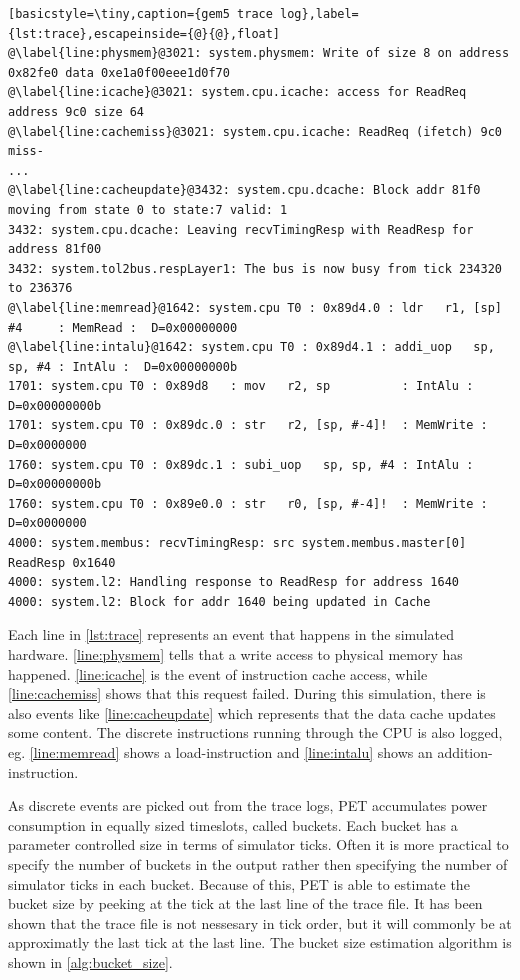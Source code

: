 \begin{lstlisting}[basicstyle=\tiny,caption={gem5 trace log},label={lst:trace},escapeinside={@}{@},float]
@\label{line:physmem}@3021: system.physmem: Write of size 8 on address 0x82fe0 data 0xe1a0f00eee1d0f70
@\label{line:icache}@3021: system.cpu.icache: access for ReadReq address 9c0 size 64
@\label{line:cachemiss}@3021: system.cpu.icache: ReadReq (ifetch) 9c0 miss-
...
@\label{line:cacheupdate}@3432: system.cpu.dcache: Block addr 81f0 moving from state 0 to state:7 valid: 1
3432: system.cpu.dcache: Leaving recvTimingResp with ReadResp for address 81f00
3432: system.tol2bus.respLayer1: The bus is now busy from tick 234320 to 236376
@\label{line:memread}@1642: system.cpu T0 : 0x89d4.0 : ldr   r1, [sp] #4     : MemRead :  D=0x00000000
@\label{line:intalu}@1642: system.cpu T0 : 0x89d4.1 : addi_uop   sp, sp, #4 : IntAlu :  D=0x00000000b
1701: system.cpu T0 : 0x89d8   : mov   r2, sp          : IntAlu :  D=0x00000000b
1701: system.cpu T0 : 0x89dc.0 : str   r2, [sp, #-4]!  : MemWrite :  D=0x0000000
1760: system.cpu T0 : 0x89dc.1 : subi_uop   sp, sp, #4 : IntAlu :  D=0x00000000b
1760: system.cpu T0 : 0x89e0.0 : str   r0, [sp, #-4]!  : MemWrite :  D=0x0000000
4000: system.membus: recvTimingResp: src system.membus.master[0] ReadResp 0x1640
4000: system.l2: Handling response to ReadResp for address 1640
4000: system.l2: Block for addr 1640 being updated in Cache
\end{lstlisting}

Each line in \autoref{lst:trace} represents an event that happens in the
simulated hardware.  \autoref{line:physmem} tells that a write access to
physical memory has happened. \autoref{line:icache} is the event of instruction
cache access, while \autoref{line:cachemiss} shows that this request failed.
During this simulation, there is also events like \autoref{line:cacheupdate}
which represents that the data cache updates some content. The discrete
instructions running through the CPU is also logged, eg. \autoref{line:memread}
shows a load-instruction and \autoref{line:intalu} shows an
addition-instruction.

As discrete events are picked out from the trace logs, PET accumulates power
consumption in equally sized timeslots, called buckets. Each bucket has a
parameter controlled size in terms of simulator ticks. Often it is more
practical to specify the number of buckets in the output rather then specifying
the number of simulator ticks in each bucket. Because of this, PET is able to
estimate the bucket size by peeking at the tick at the last line of the trace
file. It has been shown that the trace file is not nessesary in tick order,
but it will commonly be at approximatly the last tick at the last line. The
bucket size estimation algorithm is shown in \autoref{alg:bucket_size}.

